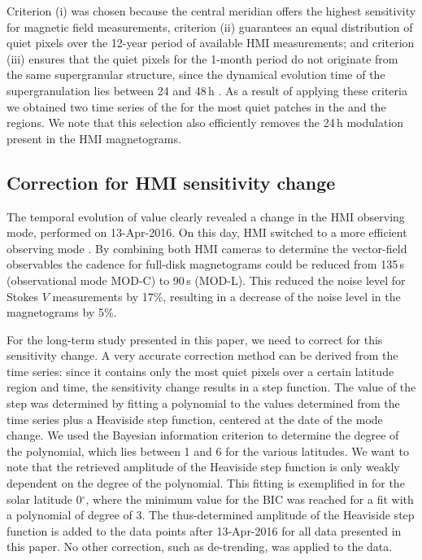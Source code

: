 \documentclass{aa}
\begin{document}
Criterion 
(i) was chosen 
because the central meridian offers the highest sensitivity for magnetic field measurements,
criterion
(ii) guarantees an equal distribution of quiet pixels over the 12-year period of available HMI measurements; and 
criterion
(iii) ensures that the quiet pixels for the 1-month period do not originate from the same supergranular structure, since the dynamical evolution time of the supergranulation lies between 24 and 48\,h \cite[]{2010LRSP....7....2R}. 
As a result of applying these criteria we obtained
two time series of the \brms{} for the most quiet patches in the \NW{} and the \IN{} regions. 
We note that this selection also efficiently removes the 24\,h modulation present in the HMI magnetograms.

\subsection{Correction for HMI sensitivity change\label{sensicorr}}

The temporal evolution of \inw{} \brms{} value
clearly revealed  a change in the HMI observing mode, performed on 13-Apr-2016. On this day, HMI switched to a more efficient observing mode \cite[see][]{2018SoPh..293...45H,2014SoPh..289.3483H,2016SoPh..291.1887C}. By combining both HMI cameras to determine the vector-field observables the cadence for full-disk magnetograms could be reduced from 135\,s (observational mode MOD-C) to 90\,s (MOD-L). This reduced the noise level for Stokes $V$ measurements by 17\%, resulting in a decrease of the noise level in the \los{} magnetograms by 5\%.

For the long-term study presented in this paper, we need to correct for this sensitivity change. A very accurate correction method can be derived from the \inw{} time series: since it contains only the most quiet pixels over a certain latitude region and time, the sensitivity change results in a step function. The value of the step was determined by fitting a polynomial to the \brms{} values determined from the \inw{} time series plus a Heaviside step function, centered at the date of the mode change. We used the Bayesian information criterion \cite[BIC,][]{Stoica2004} to determine the degree of the polynomial, which lies between 1 and 6 for the various latitudes. We want to note that the retrieved amplitude of the Heaviside step function is only weakly dependent on the degree of the polynomial. This fitting is exemplified in  for the solar latitude 0$^\circ$, where the minimum value for the BIC was reached for a fit with a polynomial of 
degree of 3. 
The thus-determined amplitude of the Heaviside step function is added to the 
\brms{}
data points after 13-Apr-2016 for all data presented in this paper. No other correction, such as de-trending, was applied to the data.
\end{document}
